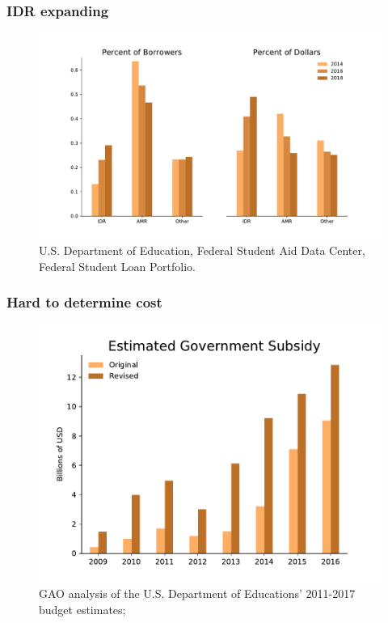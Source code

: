 \documentclass[10pt]{beamer}
\begin{document}
  \begin{frame} \frametitle{IDR expanding}

     \begin{figure}
       \includegraphics[width=\textwidth]{../ms/images/StudentLoans/idr_enrollment_ts.pdf}
       \caption*{\tiny{U.S. Department of Education, Federal Student Aid Data Center, Federal Student Loan Portfolio.}}
     \end{figure}

  \end{frame}

  \begin{frame} \frametitle{Hard to determine cost}

     \begin{figure}
       \includegraphics[width=\textwidth]{../ms/images/StudentLoans/GovSubsidy_Original_v_Revised.pdf}
       \caption*{\tiny{GAO analysis of the U.S. Department of Educations' 2011-2017 budget estimates; \cite{GAO-17-22}}}
     \end{figure}

  \end{frame}
\end{document}
